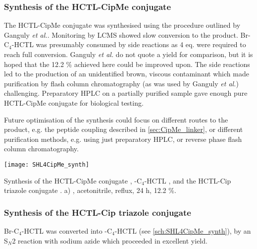 \subsubsection{Synthesis of the HCTL-CipMe conjugate }

The HCTL-CipMe conjugate  was synthesised using the procedure outlined by Ganguly \textit{et al.}\cite{Ganguly2011}. Monitoring by LCMS showed slow conversion to the product. Br-C$_4$-HCTL  was presumably consumed by side reactions as 4 eq. were required to reach full conversion. Ganguly \textit{et al.} do not quote a yield for comparison\cite{Ganguly2011,Iyer2012}, but it is hoped that the 12.2 \% achieved here could be improved upon. The side reactions led to the production of an unidentified brown, viscous contaminant which made purification by flash column chromatography (as was used by Ganguly \textit{et al.}) challenging. Preparatory HPLC on a partially purified sample gave enough pure HCTL-CipMe conjugate  for biological testing. 

Future optimisation of the synthesis could focus on different routes to the product, e.g. the peptide coupling described in \ref{sec:CipMe_linker}, or different purification methods, e.g. using just preparatory HPLC, or reverse phase flash column chromatography.

\begin{scheme}[H]
	\begin{center}
		\texttt{[image: SHL4CipMe\_synth]}
		\caption{
			Synthesis of the HCTL-CipMe conjugate , 
			-C$_4$-HCTL , and
			the HCTL-Cip triazole conjugate .
			a) , acetonitrile, reflux, 24 h, 12.2 \%.
			\label{sch:SHL4CipMe_synth}}
	\end{center}
\end{scheme}

\subsubsection{Synthesis of the HCTL-Cip triazole conjugate }

Br-C$_4$-HCTL  was converted into -C$_4$-HCTL  (see \ref{sch:SHL4CipMe_synth}), by an S$_N$2 reaction with sodium azide which proceeded in excellent yield. 

